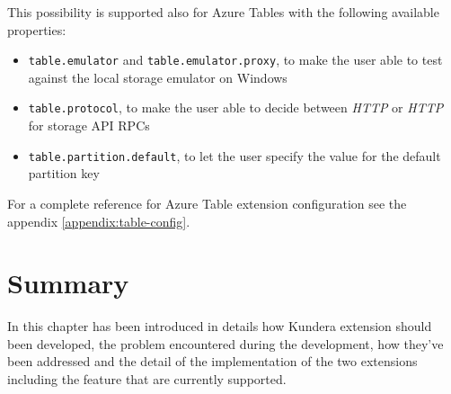 \noindent This possibility is supported also for Azure Tables with the following available properties:
\begin{itemize}
\item \texttt{table.emulator} and \texttt{table.emulator.proxy}, to make the user able to test against the local storage emulator on Windows
\item \texttt{table.protocol}, to make the user able to decide between \textit{HTTP} or \textit{HTTP} for storage API RPCs
\item \texttt{table.partition.default}, to let the user specify the value for the default partition key 
\end{itemize} 

\newparagraph For a complete reference for Azure Table extension configuration see the appendix \ref{appendix:table-config}.

\section{Summary}
In this chapter has been introduced in details how Kundera extension should been developed, the problem encountered during the development, how they've been addressed and the detail of the implementation of the two extensions including the feature that are currently supported.

